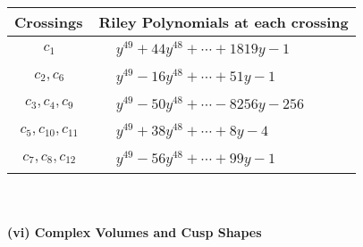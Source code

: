 \documentclass[1p]{elsarticle_modified}
\theoremstyle{definition}
\begin{document}
\begin{tabular}{m{50pt}|m{274pt}}
Crossings & \hspace{64pt}Riley Polynomials at each crossing \\
\hline $$\begin{aligned}c_{1}\end{aligned}$$&$\begin{aligned}
&y^{49}+44 y^{48}+\cdots+1819 y-1
\end{aligned}$\\
\hline $$\begin{aligned}c_{2},c_{6}\end{aligned}$$&$\begin{aligned}
&y^{49}-16 y^{48}+\cdots+51 y-1
\end{aligned}$\\
\hline $$\begin{aligned}c_{3},c_{4},c_{9}\end{aligned}$$&$\begin{aligned}
&y^{49}-50 y^{48}+\cdots-8256 y-256
\end{aligned}$\\
\hline $$\begin{aligned}c_{5},c_{10},c_{11}\end{aligned}$$&$\begin{aligned}
&y^{49}+38 y^{48}+\cdots+8 y-4
\end{aligned}$\\
\hline $$\begin{aligned}c_{7},c_{8},c_{12}\end{aligned}$$&$\begin{aligned}
&y^{49}-56 y^{48}+\cdots+99 y-1
\end{aligned}$\\
\hline
\end{tabular}\\~\\
\newpage\flushleft \textbf{(vi) Complex Volumes and Cusp Shapes}
\end{document}
